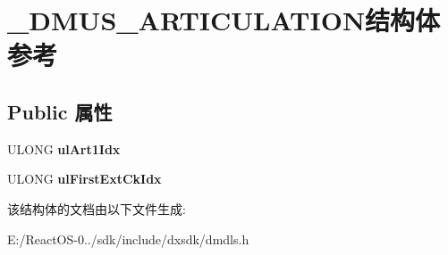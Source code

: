 \hypertarget{struct___d_m_u_s___a_r_t_i_c_u_l_a_t_i_o_n}{}\section{\+\_\+\+D\+M\+U\+S\+\_\+\+A\+R\+T\+I\+C\+U\+L\+A\+T\+I\+O\+N结构体 参考}
\label{struct___d_m_u_s___a_r_t_i_c_u_l_a_t_i_o_n}
\subsection*{Public 属性}
\begin{DoxyCompactItemize}
\item 
\mbox{\label{struct___d_m_u_s___a_r_t_i_c_u_l_a_t_i_o_n_ad8665bf75d1c5fa2a15d5a1eca1fad04}} 
U\+L\+O\+NG {\bfseries ul\+Art1\+Idx}
\item 
\mbox{\label{struct___d_m_u_s___a_r_t_i_c_u_l_a_t_i_o_n_ae651691665ab20d0a23bcc3dfffabd53}} 
U\+L\+O\+NG {\bfseries ul\+First\+Ext\+Ck\+Idx}
\end{DoxyCompactItemize}


该结构体的文档由以下文件生成\+:\begin{DoxyCompactItemize}
\item 
E\+:/\+React\+O\+S-\/0../sdk/include/dxsdk/dmdls.\+h\end{DoxyCompactItemize}
